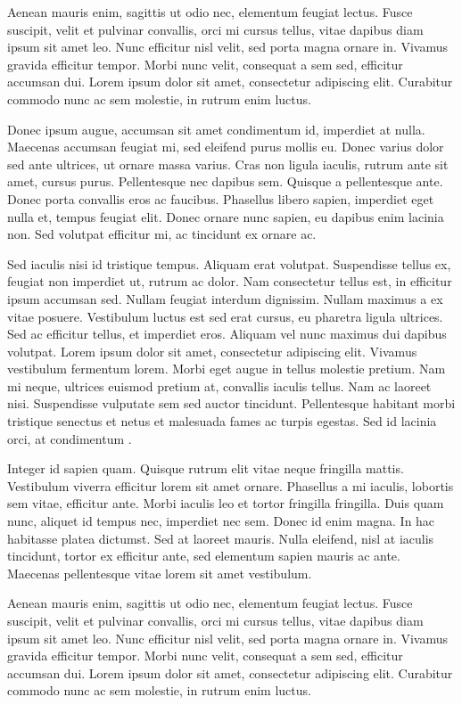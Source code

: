 \documentclass[12pt,a4paper,article]{memoir} %
\begin{document}
Aenean mauris enim, sagittis ut odio nec, elementum feugiat lectus. Fusce suscipit, velit et pulvinar convallis, orci mi cursus tellus, vitae dapibus diam ipsum sit amet leo. Nunc efficitur nisl velit, sed porta magna ornare in. Vivamus gravida efficitur tempor. Morbi nunc velit, consequat a sem sed, efficitur accumsan dui. Lorem ipsum dolor sit amet, consectetur adipiscing elit. Curabitur commodo nunc ac sem molestie, in rutrum enim luctus.

Donec ipsum augue, accumsan sit amet condimentum id, imperdiet at nulla. Maecenas accumsan feugiat mi, sed eleifend purus mollis eu. Donec varius dolor sed ante ultrices, ut ornare massa varius. Cras non ligula iaculis, rutrum ante sit amet, cursus purus. Pellentesque nec dapibus sem. Quisque a pellentesque ante. Donec porta convallis eros ac faucibus. Phasellus libero sapien, imperdiet eget nulla et, tempus feugiat elit. Donec ornare nunc sapien, eu dapibus enim lacinia non. Sed volutpat efficitur mi, ac tincidunt ex ornare ac.

Sed iaculis nisi id tristique tempus. Aliquam erat volutpat. Suspendisse tellus ex, feugiat non imperdiet ut, rutrum ac dolor. Nam consectetur tellus est, in efficitur ipsum accumsan sed. Nullam feugiat interdum dignissim. Nullam maximus a ex vitae posuere. Vestibulum luctus est sed erat cursus, eu pharetra ligula ultrices. Sed ac efficitur tellus, et imperdiet eros. Aliquam vel nunc maximus dui dapibus volutpat.
\newpage
Lorem ipsum dolor sit amet, consectetur adipiscing elit. Vivamus vestibulum fermentum lorem. Morbi eget augue in tellus molestie pretium. Nam mi neque, ultrices euismod pretium at, convallis iaculis tellus. Nam ac laoreet nisi. Suspendisse vulputate sem sed auctor tincidunt. Pellentesque habitant morbi tristique senectus et netus et malesuada fames ac turpis egestas. Sed id lacinia orci, at condimentum \arcu.

Integer id sapien quam. Quisque rutrum elit vitae neque fringilla mattis. Vestibulum viverra efficitur lorem sit amet ornare. Phasellus a mi iaculis, lobortis sem vitae, efficitur ante. Morbi iaculis leo et tortor fringilla fringilla. Duis quam nunc, aliquet id tempus nec, imperdiet nec sem. Donec id enim magna. In hac habitasse platea dictumst. Sed at laoreet mauris. Nulla eleifend, nisl at iaculis tincidunt, tortor ex efficitur ante, sed elementum sapien mauris ac ante. Maecenas pellentesque vitae lorem sit amet vestibulum.

Aenean mauris enim, sagittis ut odio nec, elementum feugiat lectus. Fusce suscipit, velit et pulvinar convallis, orci mi cursus tellus, vitae dapibus diam ipsum sit amet leo. Nunc efficitur nisl velit, sed porta magna ornare in. Vivamus gravida efficitur tempor. Morbi nunc velit, consequat a sem sed, efficitur accumsan dui. Lorem ipsum dolor sit amet, consectetur adipiscing elit. Curabitur commodo nunc ac sem molestie, in rutrum enim luctus.
\end{document}
